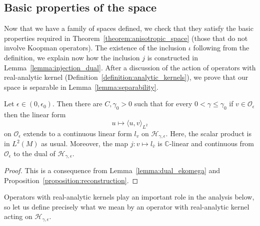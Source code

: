 \documentclass[AHL,Unicode,longabstracts,published]{cedram}
\newcommand{\clO}{\mathcal{O}}
\newcommand{\clH}{\mathcal{H}}
\newcommand{\bbC}{\mathbb{C}}
\newcommand{\clO}{\mathcal{O}}
\begin{document}
\subsection{Basic properties of the space}

Now that we have a family of spaces defined, we check that they satisfy the basic properties required in Theorem~\ref{theorem:anisotropic_space} (those that do not involve Koopman operators). The existence of the inclusion $\iota$ following from the definition, we explain now how the inclusion $j$ is constructed in Lemma~\ref{lemma:injection_dual}. After a discussion of the action of operators with real-analytic kernel (Definition~\ref{definition:analytic_kernels}), we prove that our space is separable in Lemma~\ref{lemma:separability}.

\begin{lemm}\label{lemma:injection_dual}
Let $\epsilon \in(0,\epsilon_0)$. Then there are $C,\gamma_0 >0$ such that for every $0 < \gamma \leq \gamma_0$ if $v \in \clO_\epsilon$ then the linear form
\begin{equation*}
u \mapsto \langle u, v \rangle_{L^2}
\end{equation*}
on $\clO_\epsilon$ extends to a continuous linear form $l_v$ on $\clH_{\gamma,\epsilon}$. Here, the scalar product is in $L^2(M)$ as usual. Moreover, the map $j : v \mapsto l_{\bar{v}}$ is $\bbC$-linear and continuous from $\clO_\epsilon$ to the dual of $\clH_{\gamma,\epsilon}$.
\end{lemm}

\begin{proof}
This is a consequence from Lemma~\ref{lemma:dual_ekomega} and Proposition~\ref{proposition:reconstruction}.
\end{proof}

Operators with real-analytic kernels play an important role in the analysis below, so let us define precisely what we mean by an operator with real-analytic kernel acting on $\clH_{\gamma,\epsilon}$.
\end{document}
